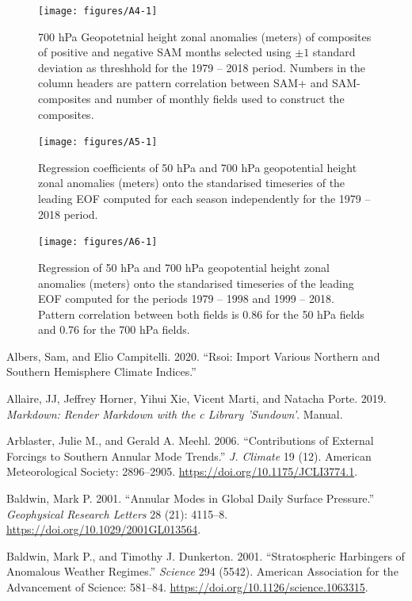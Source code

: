 \documentclass[smallextended]{svjour3}       %
\begin{document}
\begin{figure}
\texttt{[image: figures/A4-1]} \caption{700 hPa Geopotetnial height zonal anomalies (meters) of composites of positive and negative SAM months selected using $\pm1$ standard deviation as threshhold for the 1979 -- 2018 period. Numbers in the column headers are pattern correlation between SAM+ and SAM- composites and number of monthly fields used to construct the composites.}\label{fig:A4}
\end{figure}

\begin{figure}
\texttt{[image: figures/A5-1]} \caption{Regression coefficients of 50 hPa and 700 hPa geopotential height zonal anomalies (meters) onto the standarised timeseries of the leading EOF computed for each season independently for the 1979 -- 2018 period.}\label{fig:A5}
\end{figure}

\begin{figure}
\texttt{[image: figures/A6-1]} \caption{Regression of 50 hPa and 700 hPa geopotential height zonal anomalies (meters) onto the standarised timeseries of the leading EOF computed for the periods 1979 -- 1998 and 1999 -- 2018. Pattern correlation between both fields is 0.86 for the 50 hPa fields and 0.76 for the 700 hPa fields.}\label{fig:A6}
\end{figure}

\hypertarget{refs}{}
\leavevmode\hypertarget{ref-albers2020}{}%
Albers, Sam, and Elio Campitelli. 2020. ``Rsoi: Import Various Northern and Southern Hemisphere Climate Indices.''

\leavevmode\hypertarget{ref-allaire2019}{}%
Allaire, JJ, Jeffrey Horner, Yihui Xie, Vicent Marti, and Natacha Porte. 2019. \emph{Markdown: Render Markdown with the c Library 'Sundown'}. Manual.

\leavevmode\hypertarget{ref-arblaster2006}{}%
Arblaster, Julie M., and Gerald A. Meehl. 2006. ``Contributions of External Forcings to Southern Annular Mode Trends.'' \emph{J. Climate} 19 (12). American Meteorological Society: 2896--2905. \url{https://doi.org/10.1175/JCLI3774.1}.

\leavevmode\hypertarget{ref-baldwin2001a}{}%
Baldwin, Mark P. 2001. ``Annular Modes in Global Daily Surface Pressure.'' \emph{Geophysical Research Letters} 28 (21): 4115--8. \url{https://doi.org/10.1029/2001GL013564}.

\leavevmode\hypertarget{ref-baldwin2001}{}%
Baldwin, Mark P., and Timothy J. Dunkerton. 2001. ``Stratospheric Harbingers of Anomalous Weather Regimes.'' \emph{Science} 294 (5542). American Association for the Advancement of Science: 581--84. \url{https://doi.org/10.1126/science.1063315}.
\end{document}
